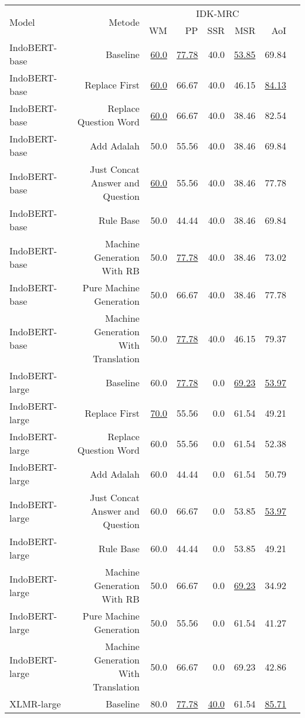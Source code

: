 \begin{table}[H]\centering
\footnotesize
\begin{tabular}{lrrrrrrr}\toprule
\multirow{2}{*}{Model} &\multirow{2}{*}{Metode} &\multicolumn{5}{c}{IDK-MRC} \\\cmidrule{3-7}
& &WM &PP &SSR &MSR &AoI \\\midrule
IndoBERT-base &Baseline &\underline{60.0} &\underline{77.78} &40.0 &\underline{53.85} &69.84 \\
IndoBERT-base &Replace First &\underline{60.0} &66.67 &40.0 &46.15 &\underline{84.13} \\
IndoBERT-base &Replace Question Word &\underline{60.0} &66.67 &40.0 &38.46 &82.54 \\
IndoBERT-base &Add Adalah &50.0 &55.56 &40.0 &38.46 &69.84 \\
IndoBERT-base &Just Concat Answer and Question &\underline{60.0} &55.56 &40.0 &38.46 &77.78 \\
IndoBERT-base &Rule Base &50.0 &44.44 &40.0 &38.46 &69.84 \\
IndoBERT-base &Machine Generation With RB &50.0 &\underline{77.78} &40.0 &38.46 &73.02 \\
IndoBERT-base &Pure Machine Generation &50.0 &66.67 &40.0 &38.46 &77.78 \\
IndoBERT-base &Machine Generation With Translation &50.0 &\underline{77.78} &40.0 &46.15 &79.37 \\
\hline
IndoBERT-large &Baseline &60.0 &\underline{77.78} &0.0 &\underline{69.23} &\underline{53.97} \\
IndoBERT-large &Replace First &\underline{70.0} &55.56 &0.0 &61.54 &49.21 \\
IndoBERT-large &Replace Question Word &60.0 &55.56 &0.0 &61.54 &52.38 \\
IndoBERT-large &Add Adalah &60.0 &44.44 &0.0 &61.54 &50.79 \\
IndoBERT-large &Just Concat Answer and Question &60.0 &66.67 &0.0 &53.85 &\underline{53.97} \\
IndoBERT-large &Rule Base &60.0 &44.44 &0.0 &53.85 &49.21 \\
IndoBERT-large &Machine Generation With RB &50.0 &66.67 &0.0 &\underline{69.23} &34.92 \\
IndoBERT-large &Pure Machine Generation &50.0 &55.56 &0.0 &61.54 &41.27 \\
IndoBERT-large &Machine Generation With Translation &50.0 &66.67 &0.0 &69.23 &42.86 \\
\hline
XLMR-large &Baseline &80.0 &\underline{77.78} &\underline{40.0} &61.54 &\underline{85.71} \\

\end{tabular}
\end{table}
